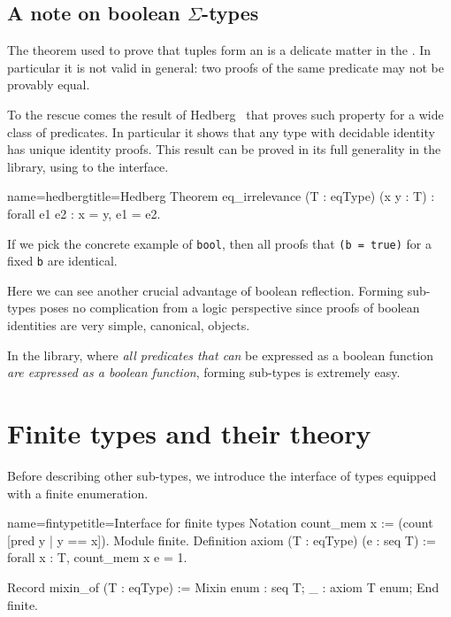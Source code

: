 \subsection{A note on boolean $\Sigma$-types\label{hedberg}}

The  theorem used to prove that tuples form an
 is a delicate matter in the \mcbCIC{}.  In particular it
is not valid in general: two proofs of the same predicate may not be
provably equal.

To the rescue comes the result of Hedberg~\cite{Hedberg}
that proves such property for a wide class of predicates.
In particular it shows that any type with decidable identity
has unique identity proofs. This result can be proved in its full generality
in the \mcbMC{} library, using to the  interface.

\begin{coq}{name=hedberg}{title=Hedberg}
Theorem eq_irrelevance (T : eqType) (x y : T) : forall e1 e2 : x = y, e1 = e2.
\end{coq}

If we pick the concrete example of \lstinline/bool/,
then all proofs that \lstinline/(b = true)/
for a fixed \lstinline/b/ are identical.

Here we can see another crucial advantage of boolean reflection.
Forming sub-types poses no complication from a logic perspective since
proofs of boolean identities are very simple, canonical, objects.

In the \mcbMC{} library, where \emph{all predicates that can} be
expressed as a boolean function \emph{are expressed as a boolean
function}, forming sub-types is extremely easy.


\section{Finite types and their theory}

Before describing other sub-types, we introduce the interface of
types equipped with a finite enumeration.

\begin{coq}{name=fintype}{title=Interface for finite types}
Notation count_mem x := (count [pred y | y == x]).
Module finite.
Definition axiom (T : eqType) (e : seq T) :=
  forall x : T, count_mem x e = 1.

Record mixin_of (T : eqType) := Mixin {
  enum : seq T;
  _ : axiom T enum;
}
End finite.
\end{coq}

